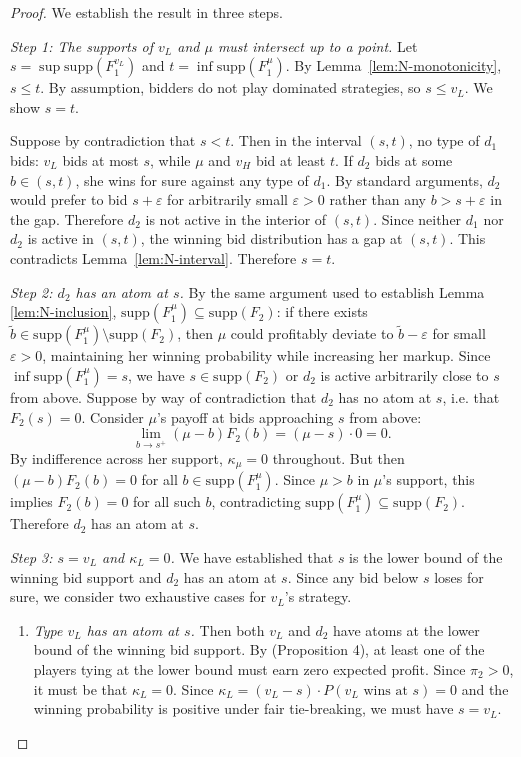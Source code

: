 \documentclass[11pt]{article}
\theoremstyle{plain}
\theoremstyle{definition}
\theoremstyle{plain}
\theoremstyle{plain}
\theoremstyle{plain}
\theoremstyle{plain}
\numberwithin{equation}{section}
\begin{document}
\begin{proof}
We establish the result in three steps.
\vspace{2mm}

\noindent \textit{Step 1: The supports of $v_L$ and $\mu$ must intersect up to a point.}
Let $s = \sup \text{supp}(F_1^{v_L})$ and $t = \inf \text{supp}(F_1^{\mu})$. By Lemma~\ref{lem:N-monotonicity}, $s \leq t$. By assumption, bidders do not play dominated strategies, so $s \leq v_L$. We show $s = t$.

\noindent Suppose by contradiction that $s < t$. Then in the interval $(s, t)$, no type of $d_1$ bids: $v_L$ bids at most $s$, while $\mu$ and $v_H$ bid at least $t$. If $d_2$ bids at some $b \in (s, t)$, she wins for sure against any type of $d_1$. By standard arguments, $d_2$ would prefer to bid $s + \varepsilon$ for arbitrarily small $\varepsilon > 0$ rather than any $b > s + \varepsilon$ in the gap. Therefore $d_2$ is not active in the interior of $(s, t)$. Since neither $d_1$ nor $d_2$ is active in $(s, t)$, the winning bid distribution has a gap at $(s, t)$. This contradicts Lemma~\ref{lem:N-interval}. Therefore $s = t$.
\vspace{2mm}

\noindent \textit{Step 2: $d_2$ has an atom at $s$.}
By the same argument used to establish Lemma \ref{lem:N-inclusion}, $\text{supp}(F_1^{\mu}) \subseteq \text{supp}(F_2)$: if there exists $\tilde{b} \in \text{supp}(F_1^{\mu}) \setminus \text{supp}(F_2)$, then $\mu$ could profitably deviate to $\tilde{b} - \varepsilon$ for small $\varepsilon > 0$, maintaining her winning probability while increasing her markup. Since $\inf \text{supp}(F_1^{\mu}) = s$, we have $s \in \text{supp}(F_2)$ or $d_2$ is active arbitrarily close to $s$ from above. 
\noindent Suppose by way of contradiction that $d_2$ has no atom at $s$, i.e. that $F_2(s) = 0$. Consider $\mu$'s payoff at bids approaching $s$ from above:
\[
\lim_{b \to s^+} (\mu - b) F_2(b) = (\mu - s) \cdot 0 = 0.
\]
By indifference across her support, $\kappa_{\mu} = 0$ throughout. But then $(\mu - b) F_2(b) = 0$ for all $b \in \text{supp}(F_1^{\mu})$. Since $\mu > b$ in $\mu$'s support, this implies $F_2(b) = 0$ for all such $b$, contradicting $\text{supp}(F_1^{\mu}) \subseteq \text{supp}(F_2)$. Therefore $d_2$ has an atom at $s$.
\vspace{2mm}

\noindent \textit{Step 3: $s = v_L$ and $\kappa_L = 0$.}
We have established that $s$ is the lower bound of the winning bid support and $d_2$ has an atom at $s$. Since any bid below $s$ loses for sure, we consider two exhaustive cases for $v_L$'s strategy.
\begin{enumerate}
    \item \textit{Type $v_L$ has an atom at $s$.} Then both $v_L$ and $d_2$ have atoms at the lower bound of the winning bid support. By \textcite{maskinEquilibriumSealedHigh2000} (Proposition 4), at least one of the players tying at the lower bound must earn zero expected profit. Since $\pi_2 > 0$, it must be that $\kappa_L = 0$. Since $\kappa_L = (v_L - s) \cdot P(v_L \text{ wins at } s) = 0$ and the winning probability is positive under fair tie-breaking, we must have $s = v_L$.


\end{enumerate}
\end{proof}
\end{document}
